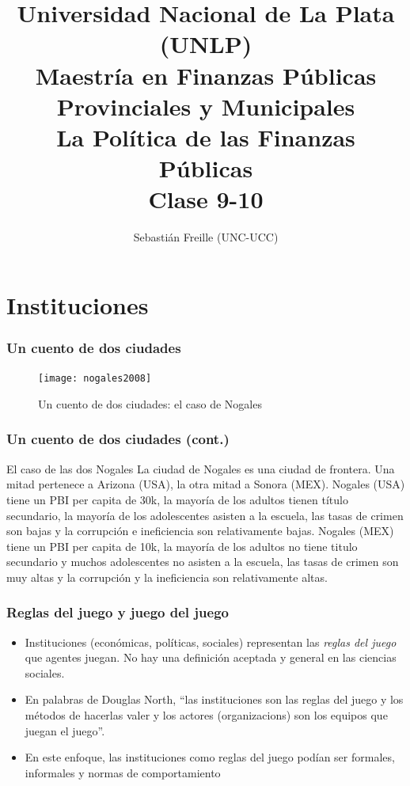 \documentclass[handout,final,xcolor=dvipsnames]{beamer}
\author{Sebastián Freille (UNC-UCC)}
\title{Universidad Nacional de La Plata (UNLP) \\
  Maestría en Finanzas Públicas Provinciales y Municipales \\ La
  Política de las Finanzas Públicas \\ Clase 9-10}
\date{}
\institute{}
\begin{document}
\maketitle


\section{Instituciones}

\begin{frame}\frametitle{Un cuento de dos ciudades}
 \begin{figure}[htbp]
    \centering
\texttt{[image: nogales2008]}
   \caption{Un cuento de dos ciudades: el caso de Nogales}
  \end{figure}
\end{frame}


\begin{frame}\frametitle{Un cuento de dos ciudades (cont.)}
\begin{block}{El caso de las dos Nogales}
La ciudad de Nogales es una ciudad de frontera. Una mitad pertenece a
Arizona (USA), la otra mitad a Sonora (MEX). Nogales (USA) tiene un
PBI per capita de 30k, la mayoría de los adultos tienen título
secundario, la mayoría de los adolescentes asisten a la
escuela, las tasas de crimen son bajas y la corrupción e ineficiencia
son relativamente bajas. Nogales (MEX) tiene un PBI per capita de 10k,
la mayoría de los adultos no tiene titulo secundario y muchos adolescentes no
asisten a la escuela,  las tasas de crimen son muy altas y la corrupción y la
ineficiencia son relativamente altas. 
\end{block}
\end{frame}


\begin{frame}\frametitle{Reglas del juego y juego del juego}
\begin{itemize}\itemsep 15pt
\item Instituciones (económicas, políticas, sociales) representan las \textit{reglas del juego} que
  agentes juegan. No hay una definición aceptada y general en las
  ciencias sociales. 
\item En palabras de Douglas North, ``las instituciones son las reglas
  del juego y los métodos de hacerlas valer y los actores
  (organizacions) son los equipos que juegan el juego''.
  \item En este enfoque, las instituciones como reglas del juego
    podían ser formales, informales y normas de comportamiento
\end{itemize}
  \end{frame}
\end{document}
